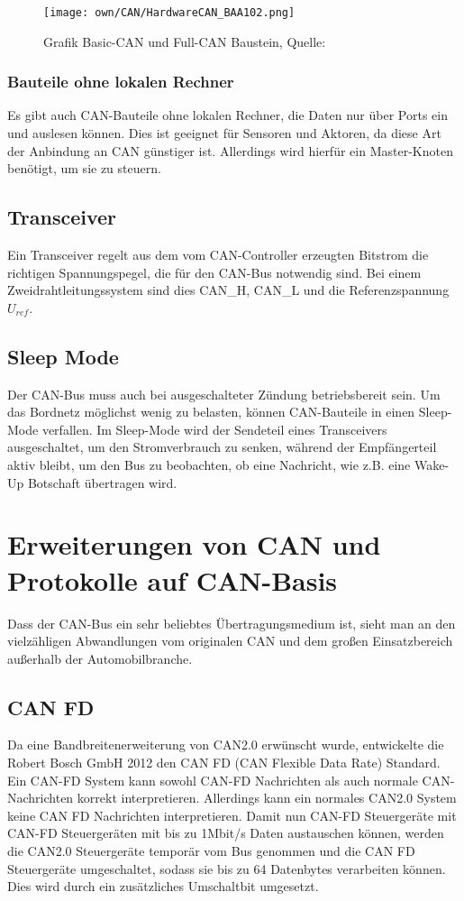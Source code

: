         \begin{figure}[!htbp]
            \centering
            \texttt{[image: own/CAN/HardwareCAN\_BAA102.png]}
            \caption{Grafik Basic-CAN und Full-CAN Baustein, Quelle: \cite{BAA2011, S.102}}
            \label{fig:HardwareCAN}
        \end{figure}

        \subsubsection{Bauteile ohne lokalen Rechner}
        Es gibt auch CAN-Bauteile ohne lokalen Rechner, die Daten nur über Ports ein und auslesen können.
        Dies ist geeignet für Sensoren und Aktoren, da diese Art der Anbindung an CAN günstiger ist.
        Allerdings wird hierfür ein Master-Knoten benötigt, um sie zu steuern. 

    \subsection{Transceiver}
    Ein Transceiver regelt aus dem vom CAN-Controller erzeugten Bitstrom die richtigen Spannungspegel, die für den CAN-Bus notwendig sind.
    Bei einem Zweidrahtleitungssystem sind dies CAN\_H, CAN\_L und die Referenzspannung $U_{ref}$. 

    \subsection{Sleep Mode}
    Der CAN-Bus muss auch bei ausgeschalteter Zündung betriebsbereit sein.
    Um das Bordnetz möglichst wenig zu belasten, können CAN-Bauteile in einen Sleep-Mode verfallen.
    Im Sleep-Mode wird der Sendeteil eines Transceivers ausgeschaltet, um den Stromverbrauch zu senken, während der Empfängerteil aktiv bleibt, um den Bus zu beobachten, ob eine Nachricht, wie z.B. eine Wake-Up Botschaft übertragen wird. 

\section{Erweiterungen von CAN und Protokolle auf CAN-Basis}
Dass der CAN-Bus ein sehr beliebtes Übertragungsmedium ist, sieht man an den vielzähligen Abwandlungen vom originalen CAN und dem großen Einsatzbereich außerhalb der Automobilbranche. 

    \subsection{CAN FD}
    Da eine Bandbreitenerweiterung von CAN2.0 erwünscht wurde, entwickelte die Robert Bosch GmbH 2012 den CAN FD (CAN Flexible Data Rate) Standard.
    Ein CAN-FD System kann sowohl CAN-FD Nachrichten als auch normale CAN-Nachrichten korrekt interpretieren.
    Allerdings kann ein normales CAN2.0 System keine CAN FD Nachrichten interpretieren.
    Damit nun CAN-FD Steuergeräte mit CAN-FD Steuergeräten mit bis zu 1Mbit/s Daten austauschen können, werden die CAN2.0 Steuergeräte temporär vom Bus genommen und die CAN FD Steuergeräte umgeschaltet, sodass sie bis zu 64 Datenbytes verarbeiten können.
    Dies wird durch ein zusätzliches Umschaltbit umgesetzt. 


